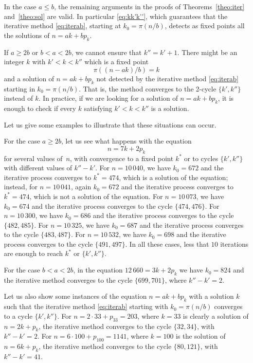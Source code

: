 \documentclass[12pt,reqno]{article}
\begin{document}
In the case $a \le b$, the remaining arguments in the proofs of Theorems~\ref{theo:iter} and~\ref{theo:sol} are valid. In particular \eqref{eq:kk'k''}, which guarantees that the iterative method \eqref{eq:iterab}, starting at $k_0 = \pi(n/b)$, detects as fixed points all the solutions of $n = ak + bp_k$.

If $a \ge 2b$ or $b < a < 2b$, we cannot ensure that $k''=k'+1$. There might be an integer $k$ with $k' < k < k''$ which is a fixed point
\[
  \pi((n-ak)/b) = k
\]
and a solution of $n = ak + bp_k$ not detected by the iterative method \eqref{eq:iterab} starting in $k_0=\pi(n/b)$. That is, the method converges to the 2-cycle $\{k',k''\}$ instead of $k$. In practice, if we are looking for a solution of $n = ak + bp_k$, it is enough to check if every $k$ satisfying $k' < k < k''$ is a solution.

Let us give some examples to illustrate that these situations can occur.

For the case $a \ge 2b$, let us see what happens with the equation
\[
  n = 7k+2p_k
\]
for several values of~$n$, with convergence to a fixed point $k^{*}$ or to cycles $\{k',k''\}$ with different values of $k''-k'$. 
For $n=10\,040$, we have $k_0 = 672$ and the iterative process converges to $k^{*} = 474$, which is a solution of the equation; 
instead, for $n = 10\,041$, again $k_0 = 672$ and the iterative process converges to $k^{*} = 474$, which is not a solution of the equation.
For $n=10\,073$, we have $k_0 = 674$ and the iterative process converges to the cycle $\{474,476\}$.
For $n=10\,300$, we have $k_0 = 686$ and the iterative process converges to the cycle $\{482,485\}$.
For $n=10\,325$, we have $k_0 = 687$ and the iterative process converges to the cycle $\{483,487\}$.
For $n=10\,532$, we have $k_0 = 698$ and the iterative process converges to the cycle $\{491,497\}$.
In all these cases, less that $10$ iterations are enough to reach $k^{*}$ or $\{k',k''\}$.

For the case $b < a < 2b$, in the equation $12\,660 = 3k+2p_k$ we have $k_0 = 824$ and the iterative method converges to the cycle $\{699,701\}$, where $k''-k'=2$. 

Let us also show some instances of the equation $n = ak+bp_k$ with a solution $k$ such that the iterative method \eqref{eq:iterab} starting with $k_0=\pi(n/b)$ converges to a cycle $\{k',k''\}$. 
For $n = 2\cdot 33 + p_{33} = 203$, where $k=33$ is clearly a solution of $n = 2k + p_{k}$, the iterative method converges to the cycle $\{32, 34\}$, with $k''-k'=2$.
For $n = 6\cdot 100 + p_{100} = 1141$, where $k=100$ is the solution of $n = 6k + p_{k}$, the iterative method converges to the cycle $\{80, 121\}$, with $k''-k'=41$.
\end{document}
